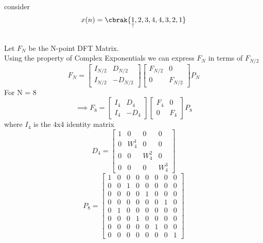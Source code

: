\documentclass[journal,12pt,twocolumn]{IEEEtran}
\begin{document}
consider
\begin{align}
    x(n) = \cbrak{\underset{\uparrow}{1},2,3,4,4,3,2,1} 
\end{align}\\
Let $F_{N}$ be the N-point DFT Matrix. \\
Using the property of Complex Exponentials we can express $F_{N}$ in terms of $F_{N/2}$\\
\begin{equation}
F_{N}=
\begin{bmatrix}
I_{N/2} & D_{N/2} \\
I_{N/2} & -D_{N/2}
\end{bmatrix}
\begin{bmatrix}
F_{N/2} & 0 \\
0 & F_{N/2}
\end{bmatrix}
P_{N}
\end{equation}
For N = 8
\begin{equation}
\implies F_{8}=
\begin{bmatrix}
I_{4} & D_{4} \\
I_{4} & -D_{4}
\end{bmatrix}
\begin{bmatrix}
F_{4} & 0 \\
0 & F_{4}
\end{bmatrix}
P_{8}
\end{equation}
where
$I_{4}$ is the 4x4 identity matrix
\begin{equation}
D_{4}=
\begin{bmatrix}
1 & 0 & 0 & 0\\
0 & W^{1}_{4} & 0 & 0\\
0 & 0 & W^{2}_{4} & 0\\
0 & 0 & 0 & W^{3}_{4}
\end{bmatrix}
\end{equation}
\begin{equation}
P_{8} =
\begin{bmatrix}
1 & 0 & 0 & 0 & 0 & 0 & 0 & 0\\
0 & 0 & 1 & 0 & 0 & 0 & 0 & 0\\
0 & 0 & 0 & 0 & 1 & 0 & 0 & 0\\
0 & 0 & 0 & 0 & 0 & 0 & 1 & 0\\
0 & 1 & 0 & 0 & 0 & 0 & 0 & 0\\
0 & 0 & 0 & 1 & 0 & 0 & 0 & 0\\
0 & 0 & 0 & 0 & 0 & 1 & 0 & 0\\
0 & 0 & 0 & 0 & 0 & 0 & 0 & 1

\end{bmatrix} 
\end{equation}\\
\end{document}
